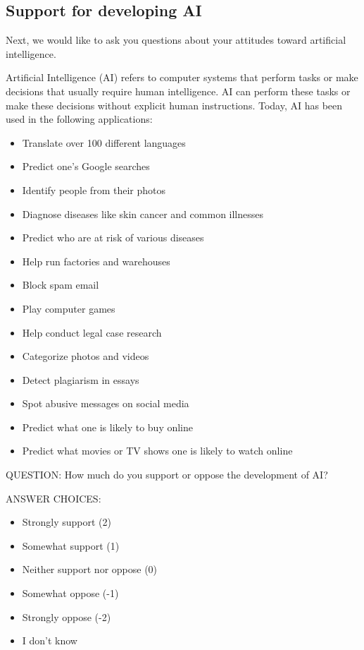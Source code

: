\documentclass{article}
\begin{document}
\subsection{Support for developing AI}


\noindent Next, we would like to ask you questions about your attitudes toward artificial intelligence.

\noindent Artificial Intelligence (AI) refers to computer systems that perform tasks or make decisions that usually require human intelligence. AI can perform these tasks or make these decisions without explicit human instructions. Today, AI has been used in the following applications:


\begin{itemize}
\item Translate over 100 different languages
\item Predict one’s Google searches
\item Identify people from their photos
\item Diagnose diseases like skin cancer and common illnesses
\item Predict who are at risk of various diseases
\item Help run factories and warehouses
\item Block spam email
\item Play computer games
\item Help conduct legal case research
\item Categorize photos and videos
\item Detect plagiarism in essays
\item Spot abusive messages on social media
\item Predict what one is likely to buy online
\item Predict what movies or TV shows one is likely to watch online
\end{itemize}

\noindent QUESTION: How much do you support or oppose the development of AI?

\noindent ANSWER CHOICES:

\begin{itemize}
\item Strongly support (2)
\item Somewhat support (1)
\item Neither support nor oppose (0)
\item Somewhat oppose (-1)
\item Strongly oppose (-2)
\item I don’t know
\end{itemize}
\end{document}
